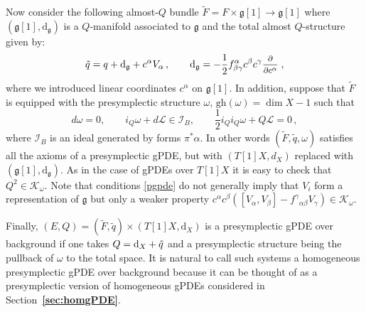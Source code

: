 \documentclass[a4paper,12pt]{article}
\numberwithin{equation}{section} %
\renewcommand{\tilde}{\widetilde}
\newcommand{\bref}[1]{\textbf{\ref{#1}}}
\newcommand{\gh}[1]{\mathrm{gh}(#1)}
\newcommand{\dx}{\mathrm{d}_X}
\renewcommand{\d}{\partial}
\newcommand{\ffrac}[2]{\raisebox{.5pt}%
  {\footnotesize$\displaystyle\frac{#1}{#2}$}\kern1pt}
\newcommand{\ddl}[2]{\ffrac{\d #1}{\d #2}}
\newcommand{\Liealg}{\mathfrak}
\newcommand{\algg}{\Liealg{g}}
\def\cI{\mathcal{I}}
\def\cK{\mathcal{K}}
\def\cL{\mathcal{L}}
\newcommand{\dg}{\mathrm{d}_\algg}
\begin{document}
Now consider the following almost-$Q$ bundle $\tilde F=F\times \algg[1] \to \algg[1]$ where $(\algg[1],\dg)$ is a $Q$-manifold associated to $\algg$ and the total almost $Q$-structure given by:
\begin{equation}
 \Tilde{q} = q + \dg+c^\alpha V_\alpha \,, \qquad \dg=-\frac{1}{2}f^\alpha_{\beta \gamma}c^\beta c^\gamma \ddl{}{c^\alpha}\,,
\end{equation}
where we introduced linear coordinates $c^\alpha$ on $\algg[1]$. In addition, suppose that $\tilde F$ is equipped with the presymplectic structure $\omega$, $\gh{\omega} = \dim X - 1$ such that 
\begin{equation}
\label{pgpde}
        d\omega = 0, \qquad i_Q\omega + d\cL \in \cI_B, \qquad \frac{1}{2}i_Q i_Q \omega + Q\cL = 0\,,
\end{equation}
where $\cI_B$ is an ideal generated by forms $\pi^*\alpha$. In other words $(\tilde F,\tilde q, \omega)$ satisfies all the axioms of a presymplectic gPDE, but with $(T[1]X,d_X)$ replaced with $(\algg[1], \dg)$. As in the case of gPDEs over $T[1]X$  it is easy to check that $Q^2 \in \cK_{\omega}$.  Note that conditions \eqref{pgpde} do not generally imply that $V_i$ form a representation of $\mathfrak{g}$ but only a weaker property $c^\alpha c^\beta ([V_\alpha, V_\beta] - f^\gamma{ }_{\alpha \beta} V_\gamma) \in \cK_\omega$.

Finally, $(E,Q) = (\tilde F,\tilde q) \times (T[1]X,\dx)$ is a presymplectic gPDE over background if one takes  $Q = \dx + \Tilde{q}$ and a presymplectic structure being the pullback of $\omega$ to the total space. It is natural to call such systems a homogeneous presymplectic gPDE over background because it can be thought of as a presymplectic version of homogeneous gPDEs considered in Section~\bref{sec:homgPDE}. 
\end{document}
